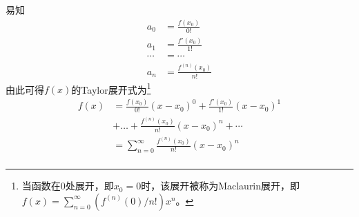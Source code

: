 易知
\begin{align*}
  a_0 &= \frac{f(x_0)}{0!} \\
  a_1 &= \frac{f'(x_0)}{1!} \\
  \cdots &= \cdots \\
  a_n &= \frac{f^{(n)}(x_0)}{n!}
\end{align*}
由此可得$f(x)$的Taylor展开式为\footnote{当函数在$0$处展开，即$x_0 = 0$时，该展开被称为Maclaurin展开，即$f(x) = \sum_{n = 0}^\infty (f^{(n)}(0)/n!)x^n$。}
\begin{align*}
  f(x) &= \frac{f(x_0)}{0!}(x - x_0)^0 + \frac{f'(x_0)}{1!}(x - x_0)^1 \\
  &+ \dots + \frac{f^{(n)}(x_0)}{n!}(x - x_0)^n + \cdots \\
  &= \sum_{n = 0}^\infty \frac{f^{(n)}(x_0)}{n!}(x - x_0)^n \\
\end{align*}
